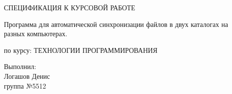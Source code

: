 \documentclass[a4paper,12pt]{report}
\begin{document}

	\begin{titlepage}
		\begin{center}
			СПЕЦИФИКАЦИЯ К КУРСОВОЙ РАБОТЕ

			\vspace{1cm}
    		
			{\huge Программа для автоматической синхронизации файлов в двух каталогах на разных компьютерах.\par}
    		
    		\vspace{1cm}
    		по курсу: ТЕХНОЛОГИИ ПРОГРАММИРОВАНИЯ
		\end{center}
		\vfill
		\begin{center}
		Выполнил: \\
		Логашов Денис\\
		группа №5512
		\end{center}
	\end{titlepage}
\end{document}
